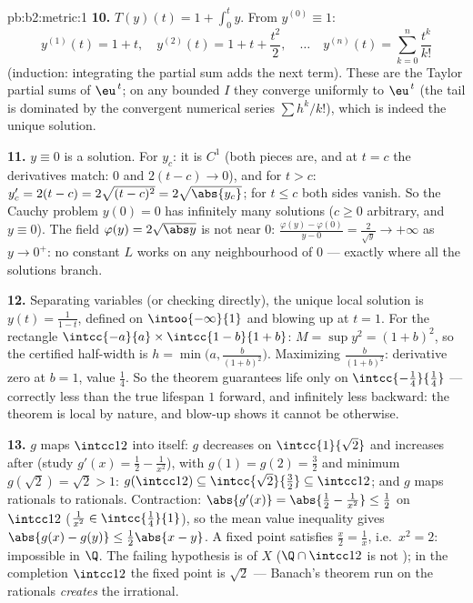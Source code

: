 \begin{solution}{pb:b2:metric:1}
\textbf{10.} $T(y)(t) = 1 + \int_0^t y$. From $y^{(0)} \equiv
1$:
\[
y^{(1)}(t) = 1 + t,\quad
y^{(2)}(t) = 1 + t + \frac{t^2}2,\quad\dots\quad
y^{(n)}(t) = \sum_{k=0}^{n}\frac{t^k}{k!}
\]
(induction: integrating the partial sum adds the next term).
These are the Taylor partial sums of $\eu^{\,t}$; on any bounded
$I$ they converge uniformly to $\eu^{\,t}$ (the tail is
dominated by the convergent numerical series $\sum h^k/k!$),
which is indeed the unique solution.

\textbf{11.} $y \equiv 0$ is a solution. For $y_c$: it is $C^1$
(both pieces are, and at $t = c$ the derivatives match: $0$ and
$2(t - c) \to 0$), and for $t > c$: $y_c' = 2(t - c) =
2\sqrt{(t-c)^2} = 2\sqrt{\abs{y_c}}$; for $t \leq c$ both sides
vanish. So the Cauchy problem $y(0) = 0$ has infinitely many
solutions ($c \geq 0$ arbitrary, and $y \equiv 0$). The field
$\varphi(y) = 2\sqrt{\abs y}$ is not  near $0$:
$\frac{\varphi(y) - \varphi(0)}{y - 0} = \frac{2}{\sqrt y} \to
+\infty$ as $y \to 0^+$: no constant $L$ works on any
neighbourhood of $0$ --- exactly where all the solutions
branch.

\textbf{12.} Separating variables (or checking directly), the
unique local solution is $y(t) = \frac1{1 - t}$, defined on
$\intoo{-\infty}{1}$ and blowing up at $t = 1$. For the
rectangle $\intcc{-a}{a} \times \intcc{1 - b}{1 + b}$: $M =
\sup y^2 = (1 + b)^2$, so the certified half-width is $h =
\min\bigl(a, \frac{b}{(1+b)^2}\bigr)$. Maximizing
$\frac{b}{(1+b)^2}$: derivative zero at $b = 1$, value
$\frac14$. So the theorem guarantees life only on
$\intcc{-\frac14}{\frac14}$ --- correctly less than the true
lifespan $1$ forward, and infinitely less backward: the theorem
is local by nature, and blow-up shows it cannot be otherwise.

\textbf{13.} $g$ maps $\intcc12$ into itself: $g$ decreases on
$\intcc{1}{\sqrt2}$ and increases after (study $g'(x) = \frac12
- \frac1{x^2}$), with $g(1) = g(2) = \frac32$ and minimum
$g(\sqrt2) = \sqrt2 > 1$: $g(\intcc12) \subseteq
\intcc{\sqrt2}{\frac32} \subseteq \intcc12$; and $g$ maps
rationals to rationals. Contraction: $\abs{g'(x)} = \abs{\frac12
- \frac1{x^2}} \leq \frac12$ on $\intcc12$ ($\frac1{x^2} \in
\intcc{\frac14}{1}$), so the mean value inequality gives
$\abs{g(x) - g(y)} \leq \frac12\abs{x - y}$. A fixed point
satisfies $\frac x2 = \frac1x$, i.e.\ $x^2 = 2$: impossible in
$\Q$. The failing hypothesis is  of $X$ ($\Q \cap
\intcc12$ is not ); in the completion $\intcc12$ the
fixed point is $\sqrt2$ --- Banach's theorem run on the
rationals \emph{creates} the irrational.


\end{solution}
